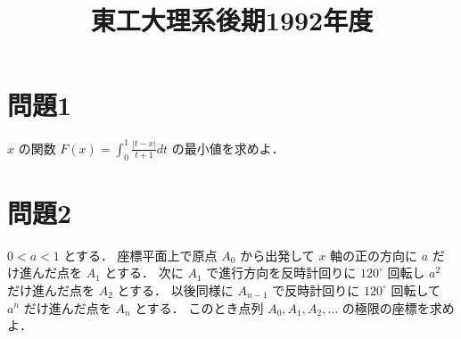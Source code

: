 \documentclass[unicode,12pt, a4paper]{ltjsarticle}%
\title{東工大理系後期1992年度}
\begin{document}
\maketitle
\section{問題1}
$x$ の関数 $\displaystyle F(x) = \int_0^1 \frac{|t-x|}{t+1} dt$ の最小値を求めよ．

\section{問題2}
$0 < a < 1$ とする．
座標平面上で原点 $A_0$ から出発して $x$ 軸の正の方向に $a$ だけ進んだ点を $A_1$ とする．
次に $A_1$ で進行方向を反時計回りに $120^\circ$ 回転し $a^2$ だけ進んだ点を $A_2$ とする．
以後同様に $A_{n-1}$ で反時計回りに $120^\circ$ 回転して $a^n$ だけ進んだ点を $A_n$ とする．
このとき点列 $A_0, A_1, A_2, \dots$ の極限の座標を求めよ．
\end{document}
